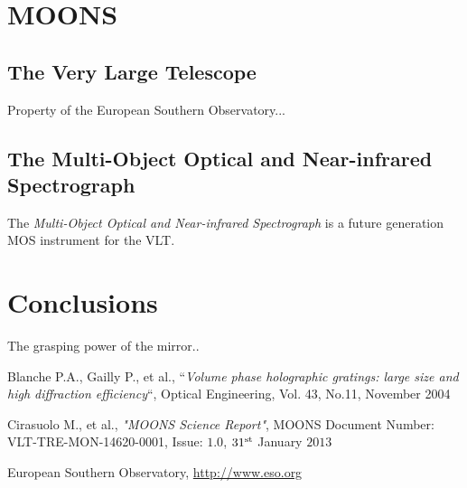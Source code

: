 \documentclass[Lau, oneside]{sapthesis}%
\begin{document}
\chapter{MOONS}
\label{chap:2}
\section{The Very Large Telescope}
Property of the European Southern Observatory...

\section{The Multi-Object Optical and Near-infrared Spectrograph}
\label{sec:moons}

The \textit{Multi-Object Optical and Near-infrared Spectrograph} is a future generation MOS instrument for the VLT. 

\chapter{Conclusions}
The grasping power of the mirror..

\backmatter
{}
\begin{thebibliography}{17}

Blanche P.A., Gailly P., et al., “\textit{Volume phase holographic gratings: large size and high diffraction efficiency}“, Optical Engineering, Vol. 43, No.11, November 2004

Cirasuolo M., et al., \textit{"MOONS Science Report"}, MOONS Document Number: VLT-TRE-MON-14620-0001, Issue: $1.0$, $31^{\textup{st}}$ January $2013$

European Southern Observatory, \url{http://www.eso.org}

\end{thebibliography}
\end{document}
